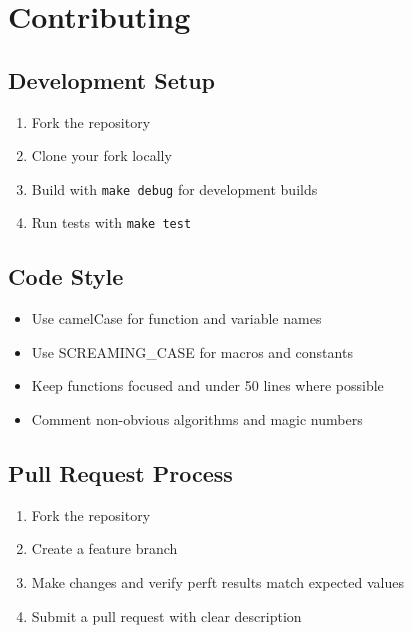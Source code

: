 \documentclass[11pt,a4paper]{report}
\begin{document}
\chapter{Contributing}

\section{Development Setup}

\begin{enumerate}
    \item Fork the repository
    \item Clone your fork locally
    \item Build with \texttt{make debug} for development builds
    \item Run tests with \texttt{make test}
\end{enumerate}

\section{Code Style}

\begin{itemize}
    \item Use camelCase for function and variable names
    \item Use SCREAMING\_CASE for macros and constants
    \item Keep functions focused and under 50 lines where possible
    \item Comment non-obvious algorithms and magic numbers
\end{itemize}

\section{Pull Request Process}

\begin{enumerate}
    \item Fork the repository
    \item Create a feature branch
    \item Make changes and verify perft results match expected values
    \item Submit a pull request with clear description
\end{enumerate}
\end{document}
